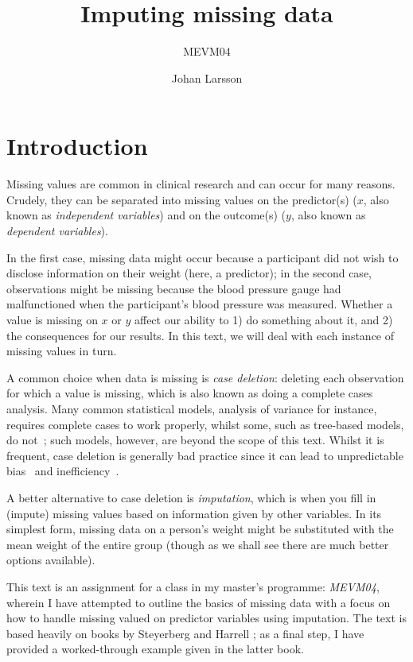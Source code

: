 \documentclass[headinclude=true, headsepline=true, DIV14]{scrartcl}\usepackage[]{graphicx}\usepackage[]{color}
\title{Imputing missing data}
\subtitle{MEVM04}
\author{Johan Larsson}
\begin{document}
\maketitle

\section{Introduction}

Missing values are common in clinical research and can occur for many reasons.
Crudely, they can be separated into missing values on the predictor(s) ($x$, also
known as \emph{independent variables}) and on the outcome(s) ($y$, also
known as \emph{dependent variables}). 

In the first case, missing data might occur because a participant did not wish
to disclose information on their weight (here, a predictor); in the second case,
observations might be missing because the blood pressure gauge had malfunctioned
when the participant's blood pressure was measured. Whether a value is missing
on $x$ or $y$ affect our ability to 1) do something about it, and 2) the
consequences for our results. In this text, we will deal with each
instance of missing values in turn.

A common choice when data is missing is \emph{case deletion}: deleting each observation
for which a value is missing, which is also known as doing a complete cases
analysis. Many common statistical models, analysis of variance for instance,
requires complete cases to work properly, whilst some, such as tree-based models,
do not~\cite{Kuhn_2013}; such models, however, are beyond the scope of this
text. Whilst it is frequent, case deletion is generally bad practice since it
can lead to unpredictable bias~\cite{knol_unpredictable_2010} and inefficiency~\cite{carpenterjames_multiple_2013}.

A better alternative to case deletion is \emph{imputation}, which is when
you fill in (impute) missing values based on information
given by other variables. In its simplest form, missing data on a person's
weight might be substituted with the mean weight of the entire group (though as
we shall see there are much better options available).

This text is an assignment for a class in my master's programme: \emph{MEVM04},
wherein I have attempted to outline the basics of missing data with a focus on
how to handle missing valued on predictor variables using imputation. The text 
is based heavily on books by Steyerberg \cite{steyerberg_clinical_2009} and 
Harrell \cite{Harrell_2015}; as a final step, I have provided a worked-through 
example given in the latter book.
\end{document}
